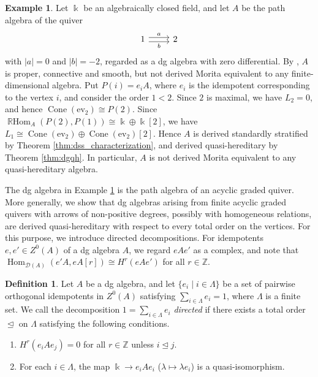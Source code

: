 \documentclass[a4paper,reqno,11pt]{amsart}
\numberwithin{equation}{section}
\theoremstyle{definition}
\newtheorem{definition}[theorem]{Definition}
\newtheorem{example}[theorem]{Example}
\newcommand{\D}{\mathcal{D}}
\newcommand{\ZZ}{\mathbb{Z}}
\newcommand{\kk}{\Bbbk}
\newcommand{\ev}{\mathrm{ev}}
\DeclareMathOperator{\Co}{Cone}
\DeclareMathOperator{\Hom}{Hom}
\DeclareMathOperator{\RHom}{\mathbb{R}Hom}
\begin{document}
\begin{example}\label{ex:RS}
Let $\kk$ be an algebraically closed field, and let $A$ be the path algebra of the quiver
\[
\begin{tikzcd}
1 \arrow[r, shift left, "a"] \arrow[r, shift right, "b"'] & 2
\end{tikzcd}
\]
with $|a|=0$ and $|b|=-2$, regarded as a dg algebra with zero differential.
By \cite[Example 4.8]{RS22}, $A$ is proper, connective and smooth, but not derived Morita equivalent to any finite-dimensional algebra.
Put $P(i)=e_{i}A$, where $e_{i}$ is the idempotent corresponding to the vertex $i$, and consider the order $1<2$.
Since $2$ is maximal, we have $L_{2}=0$, and hence $\Co(\ev_{2})\cong P(2)$.
Since $\RHom_{A}(P(2),P(1))\cong\kk\oplus\kk[2]$, we have $L_{1}\cong\Co(\ev_{2})\oplus\Co(\ev_{2})[2]$.
Hence $A$ is derived standardly stratified by Theorem \ref{thm:dss_characterization}, and derived quasi-hereditary by Theorem \ref{thm:dgqh}.
In particular, $A$ is not derived Morita equivalent to any quasi-hereditary algebra.
\end{example}

The dg algebra in Example \ref{ex:RS} is the path algebra of an acyclic graded quiver.
More generally, we show that dg algebras arising from finite acyclic graded quivers with arrows of non-positive degrees, possibly with homogeneous relations, are derived quasi-hereditary with respect to every total order on the vertices.
For this purpose, we introduce directed decompositions.
For idempotents $e,e'\in Z^{0}(A)$ of a dg algebra $A$, we regard $eAe'$ as a complex, and note that $\Hom_{\D(A)}(e'A,eA[r])\cong H^{r}(eAe')$ for all $r\in\ZZ$.

\begin{definition}\label{def:directed}
Let $A$ be a dg algebra, and let $\{e_{i}\mid i\in\Lambda\}$ be a set of pairwise orthogonal idempotents in $Z^{0}(A)$ satisfying $\sum_{i\in\Lambda}e_{i}=1$, where $\Lambda$ is a finite set.
We call the decomposition $1=\sum_{i\in\Lambda}e_{i}$ \emph{directed} if there exists a total order $\trianglelefteq$ on $\Lambda$ satisfying the following conditions.
\begin{enumerate}
\item[(D1)] $H^{r}(e_{i}Ae_{j})=0$ for all $r\in\ZZ$ unless $i\trianglelefteq j$.
\item[(D2)] For each $i\in\Lambda$, the map $\kk\to e_{i}Ae_{i}$ ($\lambda\mapsto\lambda e_{i}$) is a quasi-isomorphism.
\end{enumerate}
\end{definition}
\end{document}
